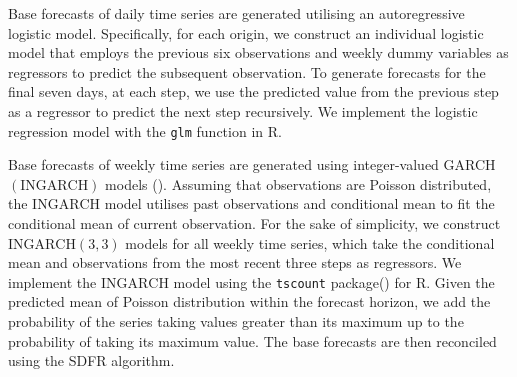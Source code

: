 \documentclass[a4paper,review,12pt,authoryear]{elsarticle}
\let\code=\texttt
\let\proglang=\textsf
\begin{document}
     Base forecasts of daily time series are generated utilising an autoregressive logistic model. 
     Specifically, for each origin, we construct an individual logistic model that employs the previous six observations and weekly dummy variables as regressors to predict the subsequent observation. 
     To generate forecasts for the final seven days, at each step, we use the predicted value from the previous step as a regressor to predict the next step recursively. 
     We implement the logistic regression model with the \code{glm} function in \proglang{R}.
     
     Base forecasts of weekly time series are generated using integer-valued GARCH $(\textrm{INGARCH})$ models (). 
     Assuming that observations are Poisson distributed, the $\textrm{INGARCH}$ model utilises past observations and conditional mean to fit the conditional mean of current observation.
     For the sake of simplicity, we construct $\textrm{INGARCH}(3, 3)$ models for all weekly time series, which take the conditional mean and observations from the most recent three steps as regressors. 
     We implement the $\textrm{INGARCH}$ model using the \code{tscount} package() for \proglang{R}.
     Given the predicted mean of Poisson distribution within the forecast horizon, we add the probability of the series taking values greater than its maximum up to the probability of taking its maximum value.
     The base forecasts are then reconciled using the \textrm{SDFR} algorithm.

     
\end{document}
